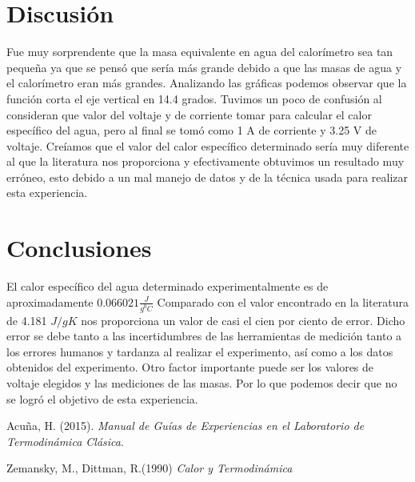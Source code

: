 \documentclass[12pt]{article}
\begin{document}
\section{Discusión}
Fue muy sorprendente que la masa equivalente en agua del calorímetro sea tan pequeña ya que se pensó que sería más grande debido a que las masas de agua y el calorímetro eran más grandes.
Analizando las gráficas podemos observar que la función corta el eje vertical en 14.4 grados.
Tuvimos un poco de confusión al consideran que valor del voltaje y de corriente tomar para calcular el calor específico del agua, pero al final se tomó como 1 A de corriente y 3.25 V de voltaje.
Creíamos que el valor del calor específico determinado sería muy diferente al que la literatura nos proporciona y efectivamente obtuvimos un resultado muy erróneo, esto debido a un mal manejo de datos y de la técnica usada para realizar esta experiencia.






\section{Conclusiones}
El calor específico del agua determinado experimentalmente es de aproximadamente $0.066021 \frac{J}{g ^0 C}$
Comparado con el valor encontrado en la literatura de 4.181 $J/gK$ nos proporciona un valor de  casi el cien por ciento de error.
Dicho error se debe tanto a las incertidumbres de las herramientas de medición tanto a los errores humanos y tardanza al realizar el experimento, así como a los datos obtenidos del experimento.
Otro factor importante puede ser los valores de voltaje elegidos y las mediciones de las masas.
Por lo que podemos decir que no se logró el objetivo de esta experiencia.


\begin{thebibliography}{6}


Acuña, H. (2015). \textit{Manual de Guías de Experiencias en el Laboratorio de Termodinámica Clásica}.

Zemansky, M., Dittman, R.(1990) \textit{Calor y Termodinámica}


\end{thebibliography}
\end{document}
